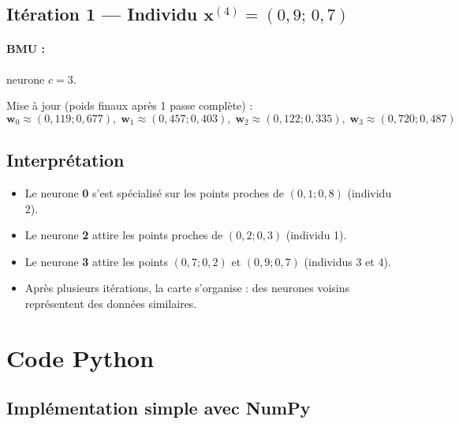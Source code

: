 \documentclass[a4paper,11pt]{article}
\theoremstyle{definition}
\begin{document}
\subsection{Itération 1 — Individu $\mathbf{x}^{(4)} = (0{,}9;\,0{,}7)$}

\paragraph{BMU :} neurone $c = 3$.

Mise à jour (poids finaux après 1 passe complète) :
\[
\boxed{
\mathbf{w}_0 \approx (0{,}119;0{,}677),\;
\mathbf{w}_1 \approx (0{,}457;0{,}403),\;
\mathbf{w}_2 \approx (0{,}122;0{,}335),\;
\mathbf{w}_3 \approx (0{,}720;0{,}487)
}
\]

\subsection{Interprétation}
\begin{itemize}
    \item Le neurone \textbf{0} s'est spécialisé sur les points proches de $(0{,}1;0{,}8)$ (individu 2).
    \item Le neurone \textbf{2} attire les points proches de $(0{,}2;0{,}3)$ (individu 1).
    \item Le neurone \textbf{3} attire les points $(0{,}7;0{,}2)$ et $(0{,}9;0{,}7)$ (individus 3 et 4).
    \item Après plusieurs itérations, la carte s'organise : des neurones voisins représentent des données similaires.
\end{itemize}

\section{Code Python}

\subsection{Implémentation simple avec NumPy}
\end{document}
